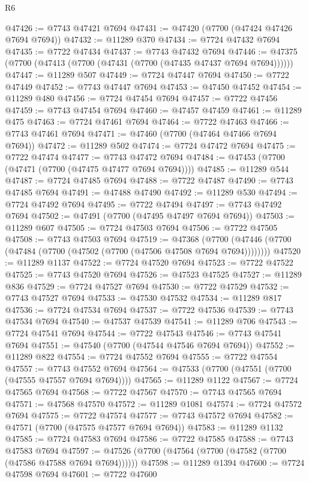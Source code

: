 \begin{lexlean}{R6}
\begin{coremodule}
@47426 := @7743 @47421 @7694
@47431 := @47420 (@7700 (@47424 @47426 @7694 @7694))
@47432 := @11289 @370
@47434 := @7724 @47432 @7694
@47435 := @7722 @47434
@47437 := @7743 @47432 @7694
@47446 := @47375 (@7700 (@47413 (@7700 (@47431 (@7700 (@47435 @47437 @7694 @7694))))))
@47447 := @11289 @507
@47449 := @7724 @47447 @7694
@47450 := @7722 @47449
@47452 := @7743 @47447 @7694
@47453 := @47450 @47452
@47454 := @11289 @480
@47456 := @7724 @47454 @7694
@47457 := @7722 @47456
@47459 := @7743 @47454 @7694
@47460 := @47457 @47459
@47461 := @11289 @475
@47463 := @7724 @47461 @7694
@47464 := @7722 @47463
@47466 := @7743 @47461 @7694
@47471 := @47460 (@7700 (@47464 @47466 @7694 @7694))
@47472 := @11289 @502
@47474 := @7724 @47472 @7694
@47475 := @7722 @47474
@47477 := @7743 @47472 @7694
@47484 := @47453 (@7700 (@47471 (@7700 (@47475 @47477 @7694 @7694))))
@47485 := @11289 @544
@47487 := @7724 @47485 @7694
@47488 := @7722 @47487
@47490 := @7743 @47485 @7694
@47491 := @47488 @47490
@47492 := @11289 @530
@47494 := @7724 @47492 @7694
@47495 := @7722 @47494
@47497 := @7743 @47492 @7694
@47502 := @47491 (@7700 (@47495 @47497 @7694 @7694))
@47503 := @11289 @607
@47505 := @7724 @47503 @7694
@47506 := @7722 @47505
@47508 := @7743 @47503 @7694
@47519 := @47368
    (@7700 (@47446 (@7700 (@47484 (@7700 (@47502 (@7700 (@47506 @47508 @7694 @7694))))))))
@47520 := @11289 @1137
@47522 := @7724 @47520 @7694
@47523 := @7722 @47522
@47525 := @7743 @47520 @7694
@47526 := @47523 @47525
@47527 := @11289 @836
@47529 := @7724 @47527 @7694
@47530 := @7722 @47529
@47532 := @7743 @47527 @7694
@47533 := @47530 @47532
@47534 := @11289 @817
@47536 := @7724 @47534 @7694
@47537 := @7722 @47536
@47539 := @7743 @47534 @7694
@47540 := @47537 @47539
@47541 := @11289 @706
@47543 := @7724 @47541 @7694
@47544 := @7722 @47543
@47546 := @7743 @47541 @7694
@47551 := @47540 (@7700 (@47544 @47546 @7694 @7694))
@47552 := @11289 @822
@47554 := @7724 @47552 @7694
@47555 := @7722 @47554
@47557 := @7743 @47552 @7694
@47564 := @47533 (@7700 (@47551 (@7700 (@47555 @47557 @7694 @7694))))
@47565 := @11289 @1122
@47567 := @7724 @47565 @7694
@47568 := @7722 @47567
@47570 := @7743 @47565 @7694
@47571 := @47568 @47570
@47572 := @11289 @1081
@47574 := @7724 @47572 @7694
@47575 := @7722 @47574
@47577 := @7743 @47572 @7694
@47582 := @47571 (@7700 (@47575 @47577 @7694 @7694))
@47583 := @11289 @1132
@47585 := @7724 @47583 @7694
@47586 := @7722 @47585
@47588 := @7743 @47583 @7694
@47597 := @47526 (@7700 (@47564 (@7700 (@47582 (@7700 (@47586 @47588 @7694 @7694))))))
@47598 := @11289 @1394
@47600 := @7724 @47598 @7694
@47601 := @7722 @47600

\end{coremodule}
\end{lexlean}
